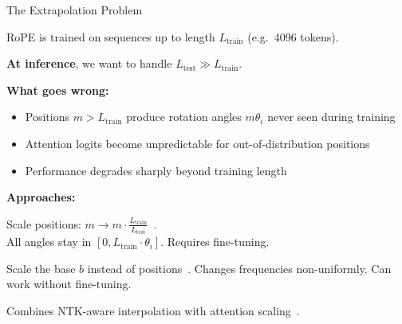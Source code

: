 \begin{frame}{The Extrapolation Problem}

  RoPE is trained on sequences up to length $L_{\text{train}}$ (e.g.\ 4096 tokens).

  \vspace{0.3em}
  \textbf{At inference}, we want to handle $L_{\text{test}} \gg L_{\text{train}}$.

  \vspace{0.5em}
  \textbf{What goes wrong:}
  \begin{itemize}
    \item Positions $m > L_{\text{train}}$ produce rotation angles $m\theta_i$ never seen during training
    \item Attention logits become unpredictable for out-of-distribution positions
    \item Performance degrades sharply beyond training length
  \end{itemize}

  \vspace{0.5em}
  \textbf{Approaches:}
  \begin{description}[labelwidth=\widthof{\bfseries NTK-aware interpolation:~~}, leftmargin=!]
    \item[Position interpolation:] Scale positions: $m \to m \cdot \frac{L_{\text{train}}}{L_{\text{test}}}$~\cite{chen2023extending}. \\
      All angles stay in $[0, L_{\text{train}} \cdot \theta_i]$. Requires fine-tuning.
    \item[NTK-aware interpolation:] Scale the base $b$ instead of positions~\cite{bloc97_2023ntk}.
      Changes frequencies non-uniformly. Can work without fine-tuning.
    \item[YaRN:] Combines NTK-aware interpolation with attention scaling~\cite{peng2023yarn}.
  \end{description}

\end{frame}

